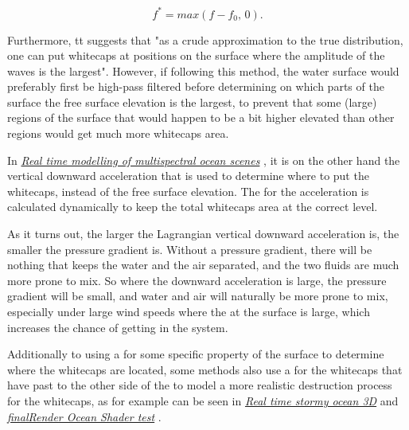 \begin{equation}
f^* = max(f-f_0,\,0).
\end{equation}

Furthermore, tt suggests that "as a crude approximation to the true distribution, one can put whitecaps at positions on the surface where the amplitude of the waves is the largest". However, if following this method, the water surface would preferably first be high-pass filtered before determining on which parts of the surface the free surface elevation is the largest, to prevent that some (large) regions of the surface that would happen to be a bit higher elevated than other regions would get much more whitecaps area.

In \textit{\href{http://web1.see.asso.fr/ocoss2010/Session_4/20100531111216_Monnier_OCOSS2010-Paper_MERCUDA_item_2.pdf}{Real time modelling of multispectral ocean scenes}} \citep{temp}, it is on the other hand the vertical downward acceleration that is used to determine where to put the whitecaps, instead of the free surface elevation. The \threshold for the acceleration is calculated dynamically to keep the total whitecaps area at the correct level. 

As it turns out, the larger the Lagrangian vertical downward acceleration is, the smaller the pressure gradient is. Without a pressure gradient, there will be nothing that keeps the water and the air separated, and the two fluids are much more prone to mix. So where the downward acceleration is large, the pressure gradient will be small, and water and air will naturally be more prone to mix, especially under large wind speeds where the  at the surface is large, which increases the chance of getting  in the system.

Additionally to using a \threshold for some specific property of the surface to determine where the whitecaps are located, some methods also use a  for the whitecaps that have past to the other side of the \threshold to model a more realistic destruction process for the whitecaps, as for example can be seen in \textit{\href{http://www.youtube.com/watch?v=3YW9WFwD-rI}{Real time stormy ocean 3D}} and \textit{\href{http://www.youtube.com/watch?v=nMcVzN6vFys}{finalRender Ocean Shader test}} \citep{temp,temp}.

